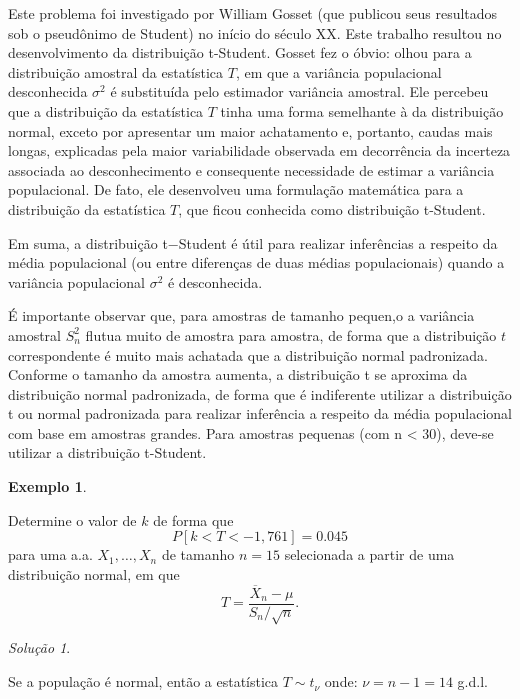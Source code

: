 \documentclass[
]{book}
\theoremstyle{definition}
\theoremstyle{definition}
\newtheorem{example}{Exemplo}[chapter]
\theoremstyle{definition}
\theoremstyle{remark}
\newtheorem*{solution}{Solução}
\begin{document}
Este problema foi investigado por William Gosset (que publicou seus resultados sob o pseudônimo de Student) no início do século XX. Este trabalho resultou no desenvolvimento da distribuição t-Student. Gosset fez o óbvio: olhou para a distribuição amostral da estatística \(T\), em que a variância populacional desconhecida \(\sigma^2\) é substituída pelo estimador variância amostral. Ele percebeu que a distribuição da estatística \(T\) tinha uma forma semelhante à da distribuição normal, exceto por apresentar um maior achatamento e, portanto, caudas mais longas, explicadas pela maior variabilidade observada em decorrência da incerteza associada ao desconhecimento e consequente necessidade de estimar a variância populacional. De fato, ele desenvolveu uma formulação matemática para a distribuição da estatística \(T\), que ficou conhecida como distribuição t-Student.

Em suma, a distribuição t−Student é útil para realizar inferências a respeito da média populacional (ou entre diferenças de duas médias populacionais) quando a variância populacional \(\sigma^2\) é desconhecida.

É importante observar que, para amostras de tamanho pequen,o a variância amostral \(S_n^2\) flutua muito de amostra para amostra, de forma que a distribuição \(t\) correspondente é muito mais achatada que a distribuição normal padronizada. Conforme o tamanho da amostra aumenta, a distribuição t se aproxima da distribuição normal padronizada, de forma que é indiferente utilizar a distribuição t ou normal padronizada para realizar inferência a respeito da média populacional com base em amostras grandes. Para amostras pequenas (com n \textless{} 30), deve-se utilizar a distribuição t-Student.

\begin{example}
\protect\hypertarget{exm:unnamed-chunk-30}{}{\label{exm:unnamed-chunk-30} }
\end{example}

Determine o valor de \(k\) de forma que
\[P[k < T < -1,761] = 0.045\]
para uma a.a. \(X_1, \ldots, X_n\) de tamanho \(n=15\) selecionada a partir de uma distribuição normal, em que
\[T = \frac{\overline{X}_n - \mu}{S_n/\sqrt{n}}.\]

\begin{solution}
{}
\end{solution}

Se a população é normal, então a estatística \(T \sim t_\nu\) onde: \(\nu = n -1 = 14\) g.d.l.
\end{document}
